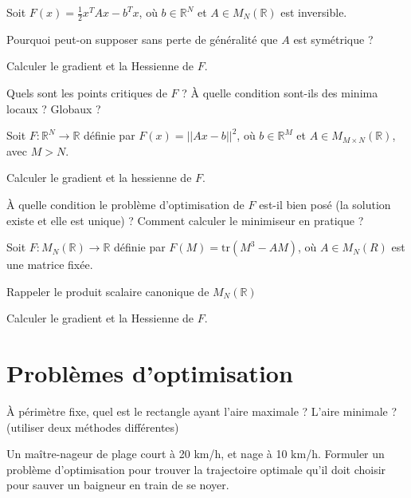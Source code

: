 \documentclass[12pt,a4paper,fleqn]{report}
\newcommand{\R}{\mathbb R}
\begin{document}
\begin{exercice}
  Soit $F(x) = \frac 1 2 x^{T} A x - b^{T} x$, où $b \in \R^{N}$ et $A
  \in M_{N}(\R)$ est inversible.
  \begin{questions}
  \item Pourquoi peut-on supposer sans perte de généralité que $A$ est
    symétrique ?
  \item Calculer le gradient et la Hessienne de $F$.
  \item Quels sont les points critiques de $F$ ? À quelle condition
    sont-ils des minima locaux ? Globaux ?
  \end{questions}
\end{exercice}

\begin{exercice}
  Soit $F : \R^{N} \to \R$ définie par $F(x) = ||{A x - b}||^{2}$, où
  $b \in \R^{M}$ et $A \in M_{M \times N}(\R)$, avec $M > N$.
  \begin{questions}
  \item Calculer le gradient et la hessienne de $F$.
  \item À quelle condition le problème d'optimisation de $F$ est-il
    bien posé (la solution existe et elle est unique) ? Comment calculer le minimiseur en pratique ?
  \end{questions}
\end{exercice}

\begin{exercice}
  Soit $F : M_{N}(\R) \to \R$ définie par $F(M) = \text{tr}(M^{3} - A
  M)$, où $A \in M_{N}(R)$ est une matrice fixée.
  \begin{questions}
  \item Rappeler le produit scalaire canonique de $M_{N}(\R)$
  \item Calculer le gradient et la Hessienne de $F$.
  \end{questions}
\end{exercice}

\section{Problèmes d'optimisation}

\begin{exercice}
  À périmètre fixe, quel est le rectangle ayant l'aire maximale ?
  L'aire minimale ? (utiliser deux méthodes différentes)
\end{exercice}

\begin{exercice}
  Un maître-nageur de plage court à 20 km/h, et nage à 10
  km/h. Formuler un problème d'optimisation pour trouver la
  trajectoire optimale qu'il doit choisir pour sauver un baigneur en
  train de se noyer.
\end{exercice}
\end{document}
